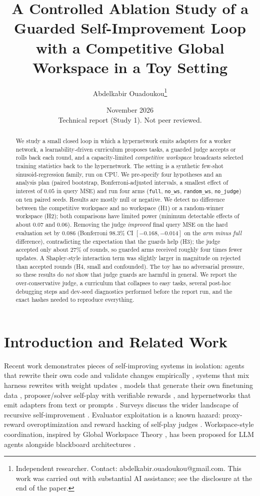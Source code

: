 \documentclass[11pt]{article}
\title{A Controlled Ablation Study of a Guarded Self-Improvement Loop\\
with a Competitive Global Workspace in a Toy Setting}
\author{Abdelkabir Ouadoukou\thanks{Independent researcher. Contact: abdelkabir.ouadoukou@gmail.com.
This work was carried out with substantial AI assistance; see the disclosure at the end of the paper.}}
\date{November 2026 \\ \small Technical report (Study 1). Not peer reviewed.}
\begin{document}
\maketitle

\begin{abstract}
We study a small closed loop in which a hypernetwork emits adapters for a worker network, a learnability-driven
curriculum proposes tasks, a guarded judge accepts or rolls back each round, and a capacity-limited
\emph{competitive workspace} broadcasts selected training statistics back to the hypernetwork. The setting is a
synthetic few-shot sinusoid-regression family, run on CPU. We pre-specify four hypotheses and an analysis plan
(paired bootstrap, Bonferroni-adjusted intervals, a smallest effect of interest of $0.05$ in query MSE) and run four
arms (\texttt{full}, \texttt{no\_ws}, \texttt{random\_ws}, \texttt{no\_judge}) on ten paired seeds.
Results are mostly null or negative. We detect no difference between the competitive workspace and no workspace
(H1) or a random-winner workspace (H2); both comparisons have limited power (minimum detectable effects of about
$0.07$ and $0.06$). Removing the judge \emph{improved} final query MSE on the hard evaluation set by $0.086$
(Bonferroni 98.3\% CI $[-0.168,-0.014]$ on the \emph{arm minus full} difference), contradicting the expectation that the guards help (H3);
the judge accepted only about $27\%$ of rounds, so guarded arms received roughly four times fewer updates.
A Shapley-style interaction term was slightly larger in magnitude on rejected than accepted rounds (H4, small and confounded).
The toy has no adversarial pressure, so these results do \emph{not} show that judge guards are harmful in general.
We report the over-conservative judge, a curriculum that collapses to easy tasks, several post-hoc debugging steps and
dev-seed diagnostics performed before the report run, and the exact hashes needed to reproduce everything.
\end{abstract}

\section{Introduction and Related Work}

Recent work demonstrates pieces of self-improving systems in isolation: agents that rewrite their own code and
validate changes empirically \citep{zhang2025dgm,zhang2026hyperagents}, systems that mix harness rewrites with
weight updates \citep{hebbar2026sia}, models that generate their own finetuning data \citep{zweiger2025seal},
proposer/solver self-play with verifiable rewards \citep{zhao2025absolutezero}, and hypernetworks that emit
adapters from text or prompts \citep{charakorn2025t2l,liang2025dnd}. Surveys discuss the wider landscape of recursive
self-improvement \citep{chen2026rsi}. Evaluator exploitation is a known hazard: proxy-reward overoptimization
\citep{gao2023scaling,coste2024ensembles} and reward hacking of self-play judges \citep{zhou2026convincing}. Workspace-style
coordination, inspired by Global Workspace Theory \citep{baars1988cognitive}, has been proposed for LLM agents
\citep{shang2026theater} alongside blackboard architectures \citep{han2025blackboard}.
\end{document}
